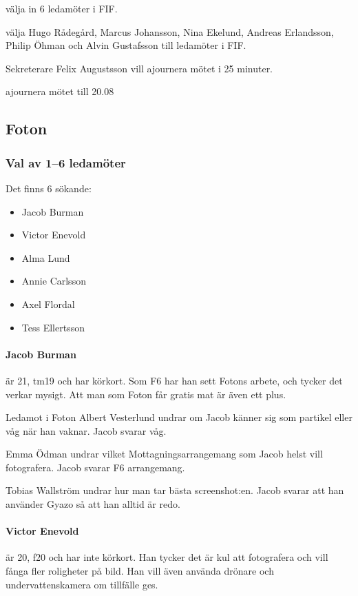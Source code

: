 \documentclass[hidelinks]{sektionsmote}
\begin{document}
\begin{beslut}
  \item välja in 6 ledamöter i FIF.
  \item välja Hugo Rådegård, Marcus Johansson, Nina Ekelund, Andreas Erlandsson, Philip Öhman och Alvin Gustafsson till ledamöter i FIF.
\end{beslut}

\begin{ofraga}
  Sekreterare Felix Augustsson vill ajournera mötet i 25 minuter.
  \begin{beslut}
    \item ajournera mötet till 20.08
  \end{beslut}
\end{ofraga}


\subsection{Foton}
\subsubsection{Val av 1--6 ledamöter}
Det finns 6 sökande:
\begin{itemize}
    \item Jacob Burman
    \item Victor Enevold
    \item Alma Lund
    \item Annie Carlsson
    \item Axel Flordal
    \item Tess Ellertsson
\end{itemize}

\paragraph{Jacob Burman} är 21, tm19 och har körkort.
Som F6 har han sett Fotons arbete, och tycker det verkar mysigt.
Att man som Foton får gratis mat är även ett plus.

Ledamot i Foton Albert Vesterlund undrar om Jacob känner sig som partikel eller våg när han vaknar.
Jacob svarar våg.

Emma Ödman undrar vilket Mottagningsarrangemang som Jacob helst vill fotografera.
Jacob svarar F6 arrangemang.

Tobias Wallström undrar hur man tar bästa screenshot:en.
Jacob svarar att han använder Gyazo så att han alltid är redo.

\paragraph{Victor Enevold} är 20, f20 och har inte körkort.
Han tycker det är kul att fotografera och vill fånga fler roligheter på bild.
Han vill även använda drönare och undervattenskamera om tillfälle ges.
\end{document}

